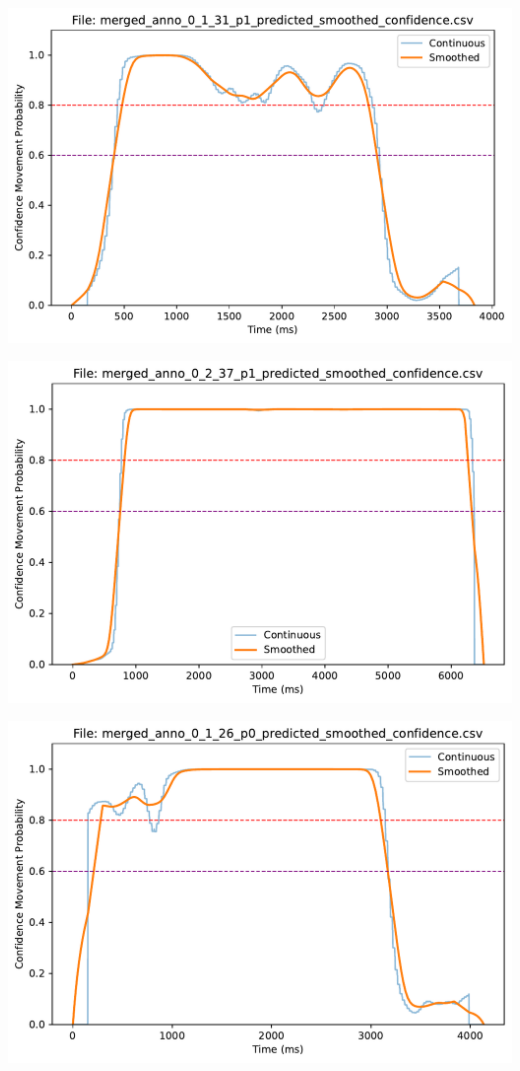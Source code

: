 \documentclass[
  letterpaper,
  DIV=11,
  numbers=noendperiod]{scrreprt}
\begin{document}
\includegraphics{04_TS_movementAnnotation/02_MovementClassifier_final_files/figure-pdf/cell-11-output-1.pdf}

\includegraphics{04_TS_movementAnnotation/02_MovementClassifier_final_files/figure-pdf/cell-11-output-2.pdf}

\includegraphics{04_TS_movementAnnotation/02_MovementClassifier_final_files/figure-pdf/cell-11-output-3.pdf}
\end{document}
